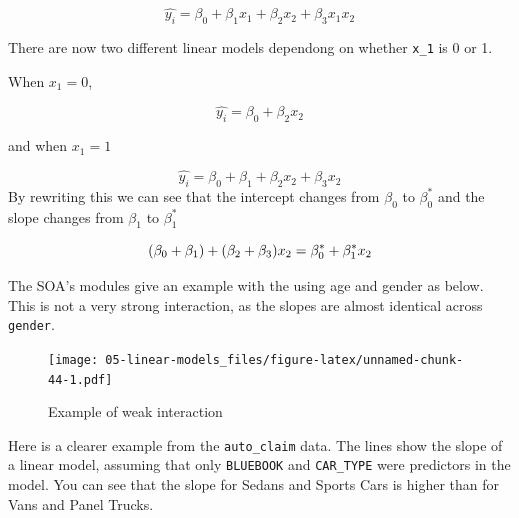 \documentclass[openany]{book}
\newenvironment{Shaded}{\begin{snugshade}}{\end{snugshade}}
\newcommand{\DataTypeTok}[1]{\textcolor[rgb]{0.13,0.29,0.53}{#1}}
\newcommand{\KeywordTok}[1]{\textcolor[rgb]{0.13,0.29,0.53}{\textbf{#1}}}
\newcommand{\NormalTok}[1]{#1}
\newcommand{\OperatorTok}[1]{\textcolor[rgb]{0.81,0.36,0.00}{\textbf{#1}}}
\newcommand{\StringTok}[1]{\textcolor[rgb]{0.31,0.60,0.02}{#1}}
\begin{document}
\[\hat{y_i} = \beta_0 + \beta_1 x_1 + \beta_2 x_2 + \beta_3 x_1 x_2\]

There are now two different linear models dependong on whether \texttt{x\_1} is 0 or 1.

When \(x_1 = 0\),

\[\hat{y_i} = \beta_0  + \beta_2 x_2\]

and when \(x_1 = 1\)

\[\hat{y_i} = \beta_0 + \beta_1 + \beta_2 x_2 + \beta_3 x_2\]
By rewriting this we can see that the intercept changes from \(\beta_0\) to \(\beta_0^*\) and the slope changes from \(\beta_1\) to \(\beta_1^*\)

\[
(\beta_0 + \beta_1) + (\beta_2 + \beta_3 ) x_2 \\
 = \beta_0^* + \beta_1^* x_2
\]

The SOA's modules give an example with the using age and gender as below. This is not a very strong interaction, as the slopes are almost identical across \texttt{gender}.

\begin{Shaded}
\end{Shaded}

\begin{figure}
\centering
\texttt{[image: 05-linear-models\_files/figure-latex/unnamed-chunk-44-1.pdf]}
\caption{\label{fig:unnamed-chunk-44}Example of weak interaction}
\end{figure}

Here is a clearer example from the \texttt{auto\_claim} data. The lines show the slope of a linear model, assuming that only \texttt{BLUEBOOK} and \texttt{CAR\_TYPE} were predictors in the model. You can see that the slope for Sedans and Sports Cars is higher than for Vans and Panel Trucks.
\end{document}
